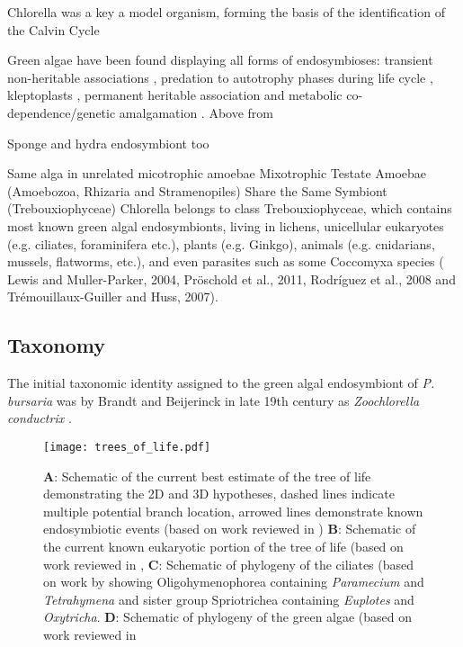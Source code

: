 Chlorella was a key a model organism, forming the basis of the identification 
of the Calvin Cycle \citep{benson1948path}


Green algae have been found displaying all forms of endosymbioses:
transient non-heritable associations \citep{Reisser1993}, 
predation to autotrophy phases during life cycle \citep{Okamoto2005},
kleptoplasts \citep{Schnepf1993}, permanent heritable
association \citep{Siegel1965} and metabolic co-dependence/genetic
amalgamation \citep{Margulis1993}.
Above from \citep{Sano2008}





Sponge and hydra endosymbiont too

Same alga in unrelated micotrophic amoebae \citep{Gomaa2014}
Mixotrophic Testate Amoebae
(Amoebozoa, Rhizaria and
Stramenopiles) Share the Same Symbiont
(Trebouxiophyceae)
Chlorella belongs to class Trebouxiophyceae, which contains most known green algal endosymbionts, living in lichens, unicellular eukaryotes (e.g. ciliates, foraminifera etc.), plants (e.g. Ginkgo), animals (e.g. cnidarians, mussels, flatworms, etc.), and even parasites such as some Coccomyxa species ( Lewis and Muller-Parker, 2004, Pröschold et al., 2011, Rodríguez et al., 2008 and Trémouillaux-Guiller and Huss, 2007).
\citep{Gomaa2014}


\subsection{Taxonomy}
The initial taxonomic identity assigned to the green algal endosymbiont of \textit{P. bursaria} was by Brandt and Beijerinck in 
late 19th century as \textit{Zoochlorella conductrix} \citep{Hoshina2010}.







 



\begin{figure}
    \texttt{[image: trees\_of\_life.pdf]}
    \caption{\textbf{A}: Schematic of the current best estimate of the tree of life demonstrating the 2D and 3D hypotheses,
dashed lines indicate multiple potential branch location, arrowed lines demonstrate known endosymbiotic events (based on work reviewed in \citep{Gribaldo2010})
\textbf{B}: Schematic of the current known eukaryotic portion of the tree of life (based on work reviewed in \citep{Burki2014,Adl2013},
\textbf{C}: Schematic of phylogeny of the ciliates (based on work by \citep{Bachvaroff2011} showing Oligohymenophorea containing \textit{Paramecium} and \textit{Tetrahymena} and sister group Spriotrichea containing \textit{Euplotes} and \textit{Oxytricha}.
\textbf{D}: Schematic of phylogeny of the green algae (based on work reviewed in \citep{Leliaert2012}}
    \label{fig:tol}
\end{figure}

